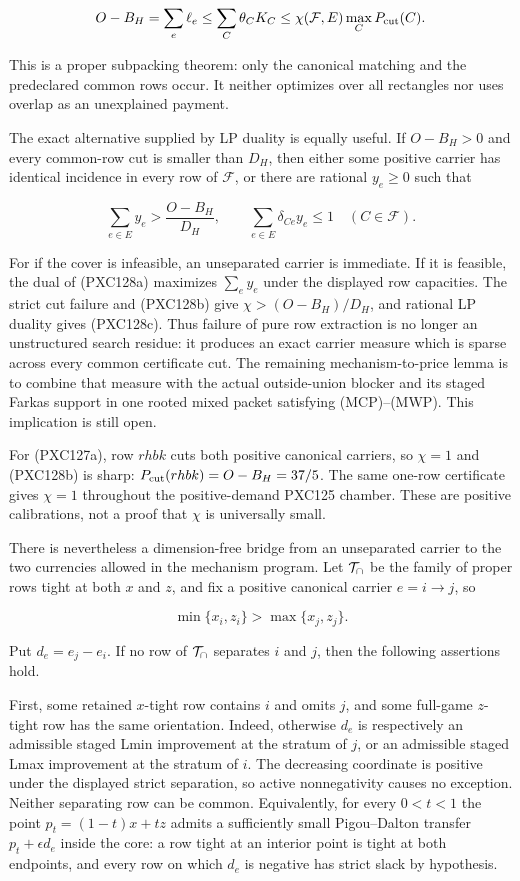 \documentclass[11pt]{article}
\begin{document}
\[
 O-B_H=\sum_e\ell_e
 \le\sum_C\theta_CK_C
 \le\chi(\mathcal F,E)\max_C P_{\rm cut}(C).
\]

This is a proper subpacking theorem: only the canonical matching and the
predeclared common rows occur.  It neither optimizes over all rectangles nor
uses overlap as an unexplained payment.

The exact alternative supplied by LP duality is equally useful.  If
$O-B_H>0$ and every common-row cut is smaller than $D_H$, then either some
positive carrier has identical incidence in every row of $\mathcal F$, or
there are rational $y_e\ge0$ such that

\begin{equation}
 \sum_{e\in E}y_e>\frac{O-B_H}{D_H},\qquad
 \sum_{e\in E}\delta_{Ce}y_e\le1
       \quad(C\in\mathcal F).                        \tag{PXC128c}
\end{equation}

For if the cover is infeasible, an unseparated carrier is immediate.  If it
is feasible, the dual of (PXC128a) maximizes $\sum_e y_e$ under the displayed
row capacities.  The strict cut failure and (PXC128b) give
$\chi>(O-B_H)/D_H$, and rational LP duality gives (PXC128c).  Thus failure of
pure row extraction is no longer an unstructured search residue: it produces
an exact carrier measure which is sparse across every common certificate
cut.  The remaining mechanism-to-price lemma is to combine that measure
with the actual outside-union blocker and its staged Farkas support in one
rooted mixed packet satisfying (MCP)--(MWP).  This implication is still open.

For (PXC127a), row $rhbk$ cuts both positive canonical carriers, so
$\chi=1$ and (PXC128b) is sharp:
$P_{\rm cut}(rhbk)=O-B_H=37/5$.  The same one-row certificate gives
$\chi=1$ throughout the positive-demand PXC125 chamber.  These are positive
calibrations, not a proof that $\chi$ is universally small.

There is nevertheless a dimension-free bridge from an unseparated carrier
to the two currencies allowed in the mechanism program.  Let
${\cal T}_{\cap}$ be the family of proper rows tight at both $x$ and $z$,
and fix a positive canonical carrier $e=i\to j$, so

\[
 \min\{x_i,z_i\}>\max\{x_j,z_j\}.
\]

Put $d_e=e_j-e_i$.  If no row of ${\cal T}_{\cap}$ separates $i$ and $j$,
then the following assertions hold.

First, some retained $x$-tight row contains $i$ and omits $j$, and some
full-game $z$-tight row has the same orientation.  Indeed, otherwise $d_e$
is respectively an admissible staged Lmin improvement at the stratum of
$j$, or an admissible staged Lmax improvement at the stratum of $i$.
The decreasing coordinate is positive under the displayed strict
separation, so active nonnegativity causes no exception.  Neither separating
row can be common.  Equivalently, for every $0<t<1$ the point
$p_t=(1-t)x+tz$ admits a sufficiently small Pigou--Dalton transfer
$p_t+\epsilon d_e$ inside the core: a row tight at an interior point is
tight at both endpoints, and every row on which $d_e$ is negative has
strict slack by hypothesis.
\end{document}
